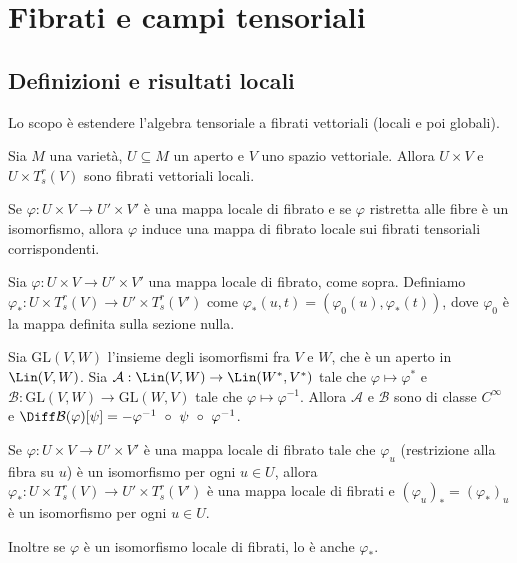 \chapter{Fibrati e campi tensoriali}

\section{Definizioni e risultati locali}

Lo scopo è estendere l'algebra tensoriale a fibrati vettoriali (locali e poi globali).

Sia $M$ una varietà, $U\subseteq M$ un aperto e $V$ uno spazio vettoriale. Allora $U\times V$ e $U\times T_s^r(V)$ sono fibrati vettoriali locali.

Se $\varphi:U\times V \to U'\times V'$ è una mappa locale di fibrato e se $\varphi$ ristretta alle fibre è un isomorfismo, allora $\varphi$ induce una mappa di fibrato locale sui fibrati tensoriali corrispondenti.

\begin{definition} 
	Sia $\varphi:U\times V \to U'\times V'$ una mappa locale di fibrato, come sopra. Definiamo $\varphi_*: U \times T_s^r(V) \to U'\times T_s^r(V')$ come $\varphi_*(u,t) = (\varphi_0(u), \varphi_*(t))$, dove $\varphi_0$ è la mappa definita sulla sezione nulla.
\end{definition}

\begin{lemma} \label{lem:DualeEInversaRegolari}
	Sia $\mathrm {GL} (V,W)$ l'insieme degli isomorfismi fra $V$ e $W$, che è un aperto in $\Lin(V,W)$. Sia $\mathcal A:\Lin(V,W)\to \Lin(W^*,V^*)$ tale che $\varphi\mapsto \varphi^*$ e $\mathcal B: \mathrm {GL} (V,W) \to \mathrm {GL} (W,V)$ tale che $\varphi \mapsto \varphi^{-1}$. %
	Allora $\mathcal A$ e $\mathcal B$ sono di classe $C^\infty$ e $\Diff \mathcal B(\varphi)[\psi] = -\varphi^{-1}\ \circ\ \psi\ \circ\ \varphi^{-1}$.
\end{lemma}

\begin{proposition} \label{prop:DaIsomorfismoLocaleFibratiVettAIsomorfismoLocaleFibratiTens}
	Se $\varphi:U\times V\to U'\times V'$ è una mappa locale di fibrato tale che $\varphi_u$ (restrizione alla fibra su $u$) è un isomorfismo per ogni $u\in U$, allora $\varphi_*: U\times T_s^r(V)\to U'\times T_s^r(V')$ è una mappa locale di fibrati e $(\varphi_u)_* = (\varphi_*)_u$ è un isomorfismo per ogni $u\in U$.
	
	Inoltre se $\varphi$ è un isomorfismo locale di fibrati, lo è anche $\varphi_*$.
\end{proposition}

